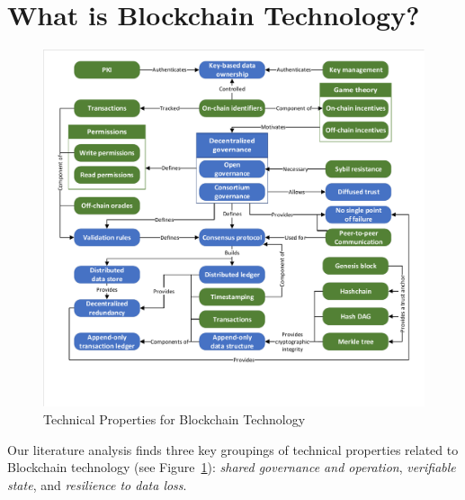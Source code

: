 
\section{What is Blockchain Technology?}
\label{sec:blockchain}

\begin{figure}
	\centering
	\includegraphics[page=2,width=\columnwidth]{figures/grounded-theory-main}
	
	\caption{Technical Properties for Blockchain Technology}
	\label{fig:technical-properties}
\end{figure}

Our literature analysis finds three key groupings of technical properties related to Blockchain technology (see Figure~\ref{fig:technical-properties}):
\textit{shared governance and operation}, \textit{verifiable state}, and 
\textit{resilience to data loss}.

